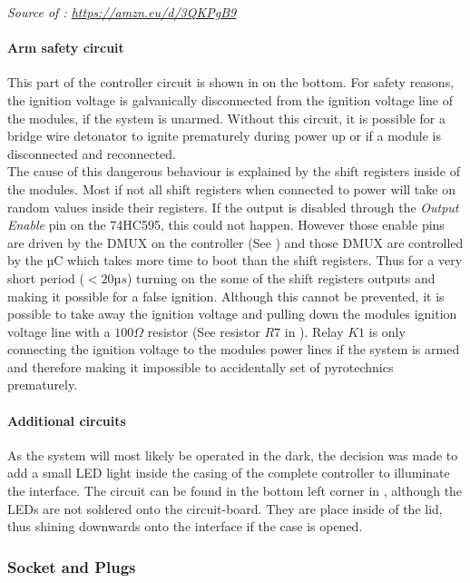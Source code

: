 \noindent \textit{\small{Source of : \url{https://amzn.eu/d/3QKPgB9}}}\\

\pagebreak

\paragraph{Arm safety circuit}
This part of the controller circuit is shown in  on the bottom. For safety reasons, the ignition voltage is galvanically disconnected from the ignition voltage line of the modules, if the system is unarmed. Without this circuit, it is possible for a bridge wire detonator to ignite prematurely during power up or if a module is disconnected and reconnected. \\
\noindent The cause of this dangerous behaviour is explained by the shift registers inside of the modules. Most if not all shift registers when connected to power will take on random values inside their registers. If the output is disabled through the \textit{Output Enable} pin on the 74HC595, this could not happen. However those enable pins are driven by the DMUX on the controller (See ) and those DMUX are controlled by the µC which takes more time to boot than the shift registers. Thus for a very short period ($<20µs$) turning on the some of the shift registers outputs and making it possible for a false ignition. Although this cannot be prevented, it is possible to take away the ignition voltage and pulling down the modules ignition voltage line with a $100\Omega$ resistor (See resistor $R7$ in ). Relay $K1$ is only connecting the ignition voltage to the modules power lines if the system is armed and therefore making it impossible to accidentally set of pyrotechnics prematurely.

\paragraph{Additional circuits}
As the system will most likely be operated in the dark, the decision was made to add a small LED light inside the casing of the complete controller to illuminate the interface. The circuit can be found in the bottom left corner in , although the LEDs are not soldered onto the circuit-board. They are place inside of the lid, thus shining downwards onto the interface if the case is opened.

\subsubsection{Socket and Plugs}
\label{Socket and Plugs}

